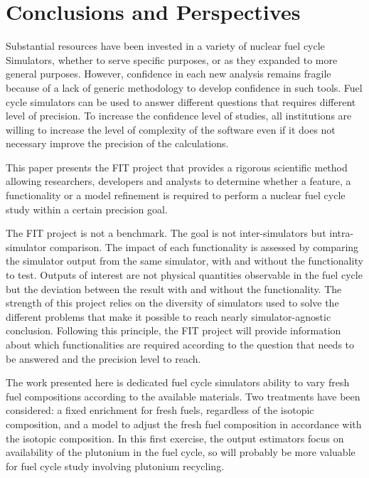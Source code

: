 \section{Conclusions and Perspectives}
\label{sec:conclusion}

Substantial resources have been invested in a variety of nuclear fuel cycle Simulators, whether to serve specific purposes, or as they expanded to more general purposes.
However, confidence in each new analysis remains fragile because of a lack of generic methodology to develop confidence in such tools.
Fuel cycle simulators can be used to answer different questions that requires different level of precision.
To increase the confidence level of studies, all institutions are willing to increase the level of complexity of the software even if it does not necessary improve the precision of the calculations.

This paper presents the FIT project that provides a rigorous scientific method allowing researchers, developers and analysts to determine whether a feature, a functionality or a model refinement is required to perform a nuclear fuel cycle study within a certain precision goal.

The FIT project is not a benchmark.
The goal is not inter-simulators but intra-simulator comparison.
The impact of each functionality is assessed by comparing the simulator output from the same simulator, with and without the functionality to test.
Outputs of interest are not physical quantities observable in the fuel cycle but the deviation between the result with and without the functionality.
The strength of this project relies on the diversity of simulators used to solve the different problems that make it possible to reach nearly simulator-agnostic conclusion.
Following this principle, the FIT project will provide information about which functionalities are required according to the question that needs to be answered and the precision level to reach.

The work presented here is dedicated fuel cycle simulators ability to vary fresh fuel compositions according to the available materials.
Two treatments have been considered: a fixed enrichment for fresh fuels, regardless of the isotopic composition, and a model to adjust the fresh fuel composition in accordance with the isotopic composition.
In this first exercise, the output estimators focus on availability of the plutonium in the fuel cycle, so will probably be more valuable for fuel cycle study involving plutonium recycling.

